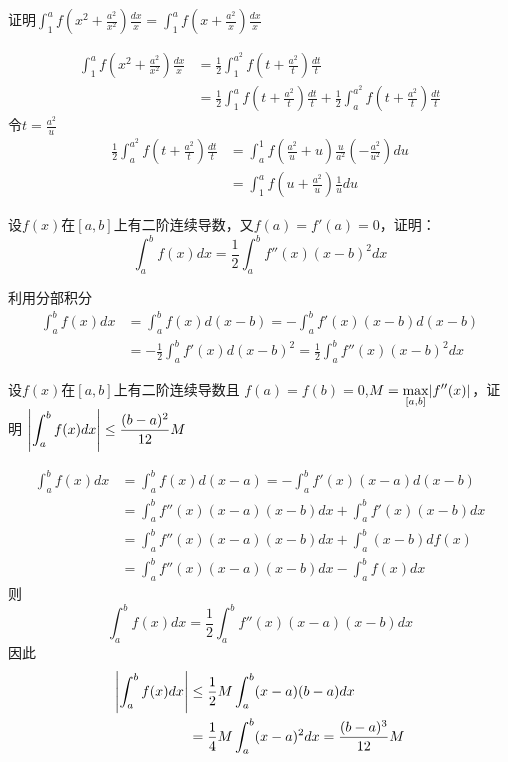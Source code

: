 \documentclass{article}
\begin{document}
\begin{examplle}[]
证明\(\displaystyle\int_1^af(x^2+\frac{a^2}{x^2})\frac{dx}{x}=
   \int_1^af(x+\frac{a^2}{x})\frac{dx}{x}\)

\begin{align*}
\int_1^af(x^2+\frac{a^2}{x^2})\frac{dx}{x}&=\frac{1}{2}\int_1^{a^2}f(t+\frac{a^2}{t})\frac{dt}{t}\\
&=\frac{1}{2}\int_1^{a}f(t+\frac{a^2}{t})\frac{dt}{t}+
\frac{1}{2}\int_a^{a^2}f(t+\frac{a^2}{t})\frac{dt}{t}
\end{align*}
令\(t=\frac{a^2}{u}\)
\begin{align*}
\frac{1}{2}\int_a^{a^2}f(t+\frac{a^2}{t})\frac{dt}{t}&=
\int^1_af(\frac{a^2}{u}+u)\frac{u}{a^2}\left(-\frac{a^2}{u^2}\right)du\\
&=\int_1^af(u+\frac{a^2}{u})\frac{1}{u}du
\end{align*}
\end{examplle}

\begin{examplle}[]
设\(f(x)\)在\([a,b]\)上有二阶连续导数，又\(f(a)=f'(a)=0\)，证明：
\begin{equation*}
\int_a^bf(x)dx=\frac{1}{2}\int_a^bf''(x)(x-b)^2dx
\end{equation*}

利用分部积分
\begin{align*}
\int_a^bf(x)dx&=\int_a^b f(x)d(x-b)=-\int_a^bf'(x)(x-b)d(x-b)\\
&=-\frac{1}{2}\int_a^bf'(x)d(x-b)^2=\frac{1}{2}\int_a^bf''(x)(x-b)^2dx
\end{align*}
\end{examplle}

\begin{examplle}[]
设\(f(x)\)在\([a,b]\)上有二阶连续导数且
\(f(a)=f(b)=0\),\(M=\displaystyle\max_{[a,b]}\abs{f''(x)}\)，证明
\(\displaystyle\abs{\int^b_af(x)dx}\le\frac{(b-a)^2}{12}M\)

\begin{align*}
\int_a^bf(x)dx&=\int_a^bf(x)d(x-a)=-\int_a^bf'(x)(x-a)d(x-b)\\
&=\int_a^bf''(x)(x-a)(x-b)dx+\int_a^bf'(x)(x-b)dx\\
&=\int_a^bf''(x)(x-a)(x-b)dx+\int_a^b(x-b)df(x)\\
&=\int_a^bf''(x)(x-a)(x-b)dx-\int_a^bf(x)dx
\end{align*}
则
\begin{equation*}
\int_a^bf(x)dx=\frac{1}{2}\int_a^bf''(x)(x-a)(x-b)dx
\end{equation*}
因此
\begin{align*}
\abs{\int_a^bf(x)dx}&\le\frac{1}{2}M\int_a^b(x-a)(b-a)dx\\
&=\frac{1}{4}M\int_a^b(x-a)^2dx=\frac{(b-a)^3}{12}M
\end{align*}
\end{examplle}
\end{document}
